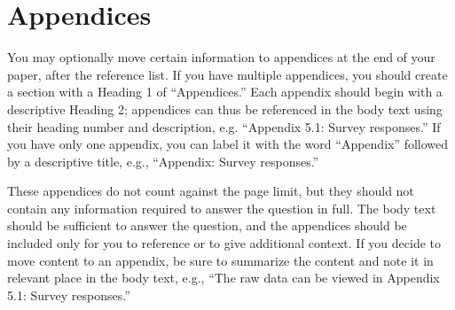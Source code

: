 




\clearpage
\section{Appendices}
You may optionally move certain information to appendices at the end of your paper, after the reference list. If you have multiple appendices, you should create a section with a Heading 1 of “Appendices.” Each appendix should begin with a descriptive Heading 2; appendices can thus be referenced in the body text using their heading number and description, e.g. “Appendix 5.1: Survey responses.” If you have only one appendix, you can label it with the word “Appendix” followed by a descriptive title, e.g., “Appendix: Survey responses.”

These appendices do not count against the page limit, but they should not contain any information required to answer the question in full. The body text should be sufficient to answer the question, and the appendices should be included only for you to reference or to give additional context. If you decide to move content to an appendix, be sure to summarize the content and note it in relevant place in the body text, e.g., “The raw data can be viewed in Appendix 5.1: Survey responses.”



